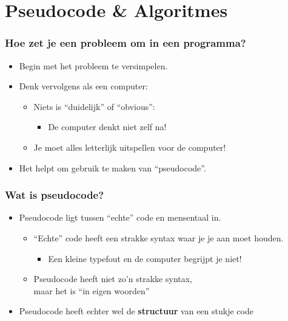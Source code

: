 \section{Pseudocode \& Algoritmes}

\begin{frame}
\frametitle{Hoe zet je een probleem om in een programma?}

\begin{itemize}
  \item<1-> Begin met het probleem te versimpelen.
  \item<2-> Denk vervolgens als een computer:
  \begin{itemize}
  	\item<3-> Niets is ``duidelijk'' of ``obvious'': 
	  \begin{itemize}
	  	\item<4-> De computer denkt niet zelf na!
	  \end{itemize}
  	\item<5-> Je moet alles letterlijk uitspellen voor de computer!
  \end{itemize}
  \item<6-> Het helpt om gebruik te maken van ``pseudocode''.
\end{itemize}

\end{frame}



\begin{frame}
\frametitle{Wat is pseudocode?}

\begin{itemize}
  \item<1-> Pseudocode ligt tussen ``echte'' code en mensentaal in.
  \begin{itemize}
  	\item<2-> ``Echte'' code heeft een strakke syntax waar je je aan moet houden.
  	\begin{itemize}
  	  \item<3-> Een kleine typefout en de computer begrijpt je niet!
  	\end{itemize}
  	\item<4-> Pseudocode heeft niet zo'n strakke syntax,\\maar het is ``in eigen woorden''
  \end{itemize}
  \item<5-> Pseudocode heeft echter wel de \textbf{structuur} van een stukje code
\end{itemize}

\end{frame}




